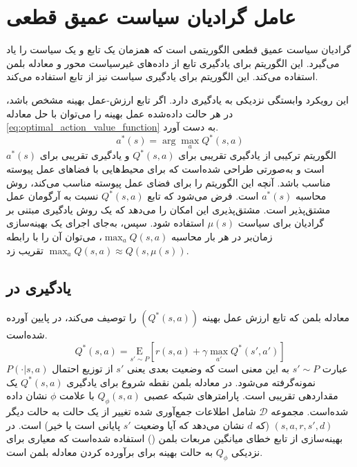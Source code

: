 \section{عامل گرادیان سیاست عمیق قطعی}\label{sec:DDPG}

گرادیان سیاست عمیق قطعی
الگوریتمی است که همزمان یک تابع  و یک سیاست را یاد می‌گیرد. این الگوريتم برای یادگیری تابع  از داده‌های غیرسیاست محور
 و معادله بلمن استفاده می‌کند. این الگوریتم برای یادگیری سیاست نیز از تابع  استفاده می‌کند.
 
 این رویکرد وابستگی نزدیکی به یادگیری  دارد. اگر تابع ارزش-عمل بهینه 
 مشخص باشد، در هر حالت داده‌شده عمل بهینه
  را می‌توان با حل
 معادله
 \eqref{eq:optimal_action_value_function}
  به دست آورد.
\begin{equation}
	\label{eq:optimal_action_value_function}
	a^*(s) = \arg \max_a Q^*(s,a)
\end{equation}
الگوریتم
ترکیبی از یادگیری تقریبی برای $ Q^*(s,a)$ و یادگیری تقریبی برای
 $a^*(s)$ 
 است و به‌صورتی طراحی شده‌است که برای محیط‌هایی با فضاهای عمل پیوسته مناسب باشد. 
    آنچه این الگوریتم را برای فضای عمل پیوسته مناسب می‌کند، 
       روش محاسبه 
    $a^*(s)$
    است.
    فرض می‌شود که تابع
     $Q^*(s,a)$
      نسبت به آرگومان عمل مشتق‌پذیر است. مشتق‌پذیری این امکان را می‌دهد که یک روش یادگیری مبتنی بر گرادیان برای سیاست
       $\mu(s)$
        استفاده شود. سپس، به‌جای اجرای یک بهینه‌سازی زمان‌بر در هر بار محاسبه
        $\max_a Q(s,a)$،
       می‌توان آن را با رابطه
        \(
        \max_a Q(s,a) \approx Q(s,\mu(s))
        \)
         تقریب زد.
         
         
\subsection{ یادگیری
در 
}
معادله بلمن که تابع ارزش عمل بهینه
 $(Q^*(s,a))$
  را توصیف می‌کند، در پایین آورده شده‌است.
\begin{equation}
	Q^*(s,a) = \underset{s' \sim P}{{\mathrm E}}\left[r(s,a) + \gamma \max_{a'} Q^*(s', a')\right]
\end{equation}
عبارت 
$s' \sim P$ 
به این معنی است که وضعیت بعدی یعنی $s'$ از توزیع احتمال
 $P(\cdot| s,a)$
 نمونه‌گرفته می‌شود.
 در معادله بلمن نقطه شروع برای یادگیری
  $Q^*(s,a)$
 یک مقداردهی تقریبی
   است. پارامترهای شبکه عصبی
    $Q_{\phi}(s,a)$
    با علامت
    $\phi$ 
    نشان داده شده‌است.
    مجموعه
     ${\mathcal D}$
      شامل اطلاعات  جمع‌آوری شده تغییر از یک حالت به حالت دیگر
       $(s,a,r,s',d)$
       (که $d$ نشان می‌دهد که آیا وضعیت $s'$ پایانی است یا خیر) است.
       در بهینه‌سازی از تابع خطای میانگین مربعات بلمن
        () استفاده شده‌است که معیاری برای نزدیکی
         $Q_{\phi}$
         به حالت بهینه
          برای برآورده کردن معادله بلمن است.
          
